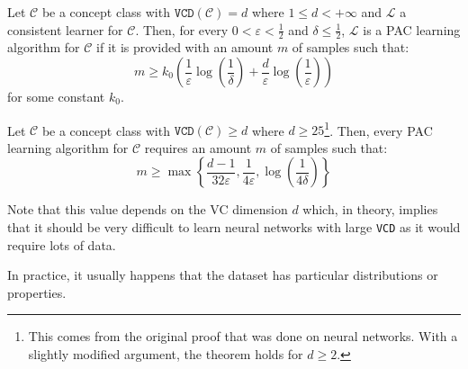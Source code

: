 \begin{theorem} 
    Let $\mathcal{C}$ be a concept class with $\texttt{VCD}(\mathcal{C}) = d$ where $1 \leq d < +\infty$ and
    $\mathcal{L}$ a consistent learner for $\mathcal{C}$.
    Then, for every $0 < \varepsilon < \frac{1}{2}$ and $\delta \leq \frac{1}{2}$,
    $\mathcal{L}$ is a PAC learning algorithm for $\mathcal{C}$ if it is provided with an amount $m$ of samples such that:
    \[ m \geq k_0 \left( \frac{1}{\varepsilon} \log\left(\frac{1}{\delta}\right) + \frac{d}{\varepsilon}\log\left(\frac{1}{\varepsilon}\right) \right) \]
    for some constant $k_0$.
\end{theorem}

\begin{theorem} 
    Let $\mathcal{C}$ be a concept class with $\texttt{VCD}(\mathcal{C}) \geq d$ where $d \geq 25$\footnote{
        This comes from the original proof that was done on neural networks. With a slightly modified argument, the theorem holds for $d \geq 2$.
    }.
    Then, every PAC learning algorithm for $\mathcal{C}$ requires an amount $m$ of samples such that:
    \[ m \geq \max \left\{ \frac{d-1}{32\varepsilon}, \frac{1}{4\varepsilon}, \log\left(\frac{1}{4\delta}\right) \right\} \]

    \begin{remark}
        Note that this value depends on the VC dimension $d$ which, in theory, 
        implies that it should be very difficult to learn neural networks with large \texttt{VCD} as it would require lots of data.
        
        In practice, it usually happens that the dataset has particular distributions or properties.
    \end{remark}
\end{theorem}


